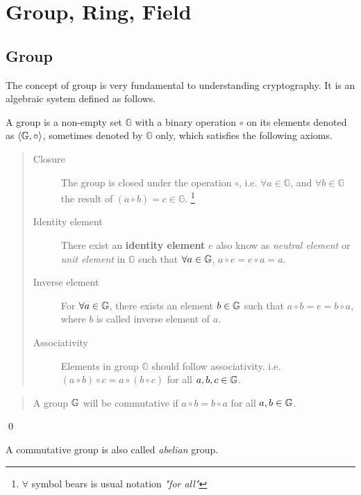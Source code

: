 \section{Group, Ring, Field}
\label{sec:chap:fund:group}
\subsection{Group}
The concept of group  is very fundamental to understanding cryptography. It is an algebraic system defined as follows.
\begin{definition}
	A group  is a non-empty set $\mathbb{G}$ with a binary operation $\circ$ on its elements denoted as  $\langle\mathbb{G}\index{group},\circ\rangle$,  sometimes denoted by   $\mathbb{G}$ only, which satisfies the following axioms.
\begin{quote}
	\begin{description}
		\item[Closure] The group is closed under the operation $\circ$, i.e.  $\forall a \in\mathbb{G}$, and $\forall b \in\mathbb{G}$ the result of $ (a\circ b) = c \in \mathbb{G}$. \footnote{$\forall$ symbol bears is usual notation \textit{"for all"} }
		
		\item[Identity element] There exist an \textbf{identity element } $e$ also know as \textit{neutral element} or \textit{unit element} in $\mathbb{G}$ such that $\forall a \in\mathbb{G} \index{group}$,  $a\circ e = e\circ a = a$.
		
		\item[Inverse element] For ${\forall}a \in\mathbb{G}\index{group}$, there exists an element $b\in\mathbb{G}\index{group}$ such that $a\circ b=e=b\circ a$, where $b$ is called inverse element of $a$.
		
		\item[Associativity] Elements in  group $\mathbb{G}$ should follow associativity. i.e. $(a\circ b)\circ c=a\circ (b\circ c)$ for all $ a,b,c\in\mathbb{G}\index{group}$.
		
\end{description}
\end{quote}
\end{definition}

\begin{definition} \hspace{0em}
\begin{quote}\begin{description}
A group  $\mathbb{G}\index{group}$ will be commutative if $a\circ b=b\circ a$ for all $a,b \in\mathbb{G}\index{group}$.
\end{description}\end{quote}
\qed
\end{definition}
A commutative group is also called \textit{abelian} group.

